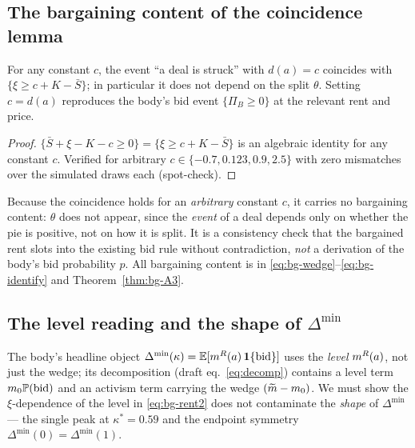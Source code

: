 \subsection{The bargaining content of the coincidence lemma}
\label{app:bg-coincide}

\begin{lemma}
\label{lem:bg-coincide}
For any constant $c$, the event ``a deal is struck'' with $d(a)=c$ coincides with
$\{\xi\ge c+K-\bar S\}$; in particular it does not depend on the split $\theta$.
Setting $c=d(a)$ reproduces the body's bid event $\{\Pi_{B}\ge0\}$ at the relevant
rent and price.
\end{lemma}
\begin{proof}
$\{\bar S+\xi-K-c\ge0\}=\{\xi\ge c+K-\bar S\}$ is an algebraic identity for any
constant $c$. Verified for arbitrary $c\in\{-0.7,0.123,0.9,2.5\}$ with zero
mismatches over the simulated draws each (spot-check).
\end{proof}

\begin{remark}
\label{rem:bg-honesty}
Because the coincidence holds for an \emph{arbitrary} constant $c$, it carries no
bargaining content: $\theta$ does not appear, since the \emph{event} of a deal
depends only on whether the pie is positive, not on how it is split. It is a
consistency check that the bargained rent slots into the existing bid rule without
contradiction, \emph{not} a derivation of the body's bid probability $p$. All
bargaining content is in \eqref{eq:bg-wedge}--\eqref{eq:bg-identify} and
Theorem~\ref{thm:bg-A3}.
\end{remark}

\subsection{The level reading and the shape of \texorpdfstring{$\Delta^{\min}$}{Dmin}}
\label{app:bg-levels}

The body's headline object
$\Delta^{\min}(\kappa)=\mathbb{E}[m^{R}(a)\,\mathbf{1}\{\text{bid}\}]$ uses the \emph{level}
$m^{R}(a)$, not just the wedge; its decomposition (draft eq.~\eqref{eq:decomp})
contains a level term $m_{0}\mathbb{P}(\text{bid})$ and an activism term carrying the
wedge $(\widetilde{m}-m_{0})$. We must show the $\xi$-dependence of the level in
\eqref{eq:bg-rent2} does not contaminate the \emph{shape} of $\Delta^{\min}$ ---
the single peak at $\kappa^{\ast}=0.59$ and the endpoint symmetry
$\Delta^{\min}(0)=\Delta^{\min}(1)$.

